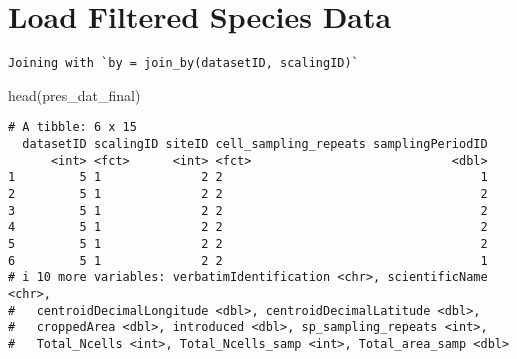 \documentclass[
  letterpaper,
  DIV=11,
  numbers=noendperiod]{scrreprt}
\newenvironment{Shaded}{\begin{snugshade}}{\end{snugshade}}
\newcommand{\AttributeTok}[1]{\textcolor[rgb]{0.40,0.45,0.13}{#1}}
\newcommand{\CommentTok}[1]{\textcolor[rgb]{0.37,0.37,0.37}{#1}}
\newcommand{\FunctionTok}[1]{\textcolor[rgb]{0.28,0.35,0.67}{#1}}
\newcommand{\NormalTok}[1]{\textcolor[rgb]{0.00,0.23,0.31}{#1}}
\newcommand{\OtherTok}[1]{\textcolor[rgb]{0.00,0.23,0.31}{#1}}
\newcommand{\SpecialCharTok}[1]{\textcolor[rgb]{0.37,0.37,0.37}{#1}}
\newcommand{\StringTok}[1]{\textcolor[rgb]{0.13,0.47,0.30}{#1}}
\begin{document}
\begin{Shaded}
\end{Shaded}

\hypertarget{load-filtered-species-data}{%
\section{Load Filtered Species Data}\label{load-filtered-species-data}}

\begin{Shaded}
\end{Shaded}

\begin{verbatim}
Joining with `by = join_by(datasetID, scalingID)`
\end{verbatim}

\begin{Shaded}
\begin{Highlighting}[]
\FunctionTok{head}\NormalTok{(pres\_dat\_final)}
\end{Highlighting}
\end{Shaded}

\begin{verbatim}
# A tibble: 6 x 15
  datasetID scalingID siteID cell_sampling_repeats samplingPeriodID
      <int> <fct>      <int> <fct>                            <dbl>
1         5 1              2 2                                    1
2         5 1              2 2                                    2
3         5 1              2 2                                    2
4         5 1              2 2                                    2
5         5 1              2 2                                    2
6         5 1              2 2                                    1
# i 10 more variables: verbatimIdentification <chr>, scientificName <chr>,
#   centroidDecimalLongitude <dbl>, centroidDecimalLatitude <dbl>,
#   croppedArea <dbl>, introduced <dbl>, sp_sampling_repeats <int>,
#   Total_Ncells <int>, Total_Ncells_samp <int>, Total_area_samp <dbl>
\end{verbatim}
\end{document}
